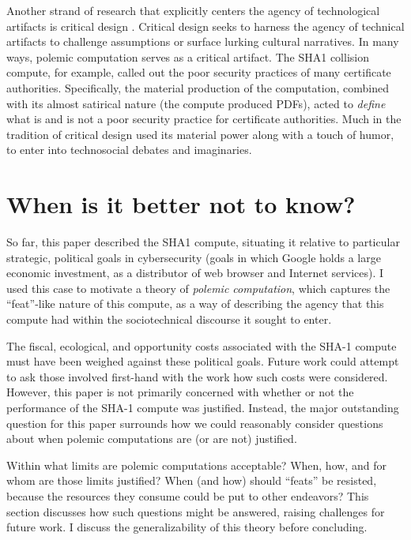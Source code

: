 \documentclass[sigconf]{acmart}
\begin{document}
Another strand of research that explicitly centers the agency of technological artifacts
is critical design \cite{Dunne2001}.
Critical design seeks to harness the agency of technical artifacts 
to challenge assumptions or surface lurking cultural narratives.
In many ways, polemic computation serves as a critical artifact.
The SHA1 collision compute, for example, 
called out the poor security practices of many certificate authorities.
Specifically, the material production of the computation,
combined with its almost satirical nature (the compute produced PDFs),
acted to \emph{define} what is and is not a poor security practice for certificate authorities.
Much in the tradition of critical design
used its material power \cite{Bennett2013a} along with a touch of humor, to enter into technosocial debates and imaginaries.

\section{When is it better not to know?}
\label{sec:orgffe5e6d}

So far, this paper described the SHA1 compute, situating it relative to particular strategic, political goals in cybersecurity (goals in which Google holds a large economic investment, as a distributor of web browser and Internet services).
I used this case to motivate a theory of \emph{polemic computation}, which captures the ``feat''-like nature of this compute, as a way of describing the agency that this compute had within the sociotechnical discourse it sought to enter.

The fiscal, ecological, and opportunity costs associated with the SHA-1 compute must have been weighed against these political goals. Future work could attempt to ask those involved first-hand with the work how such costs were considered.
However, this paper is not primarily concerned with whether or not the performance of the SHA-1 compute was justified. 
Instead, the major outstanding question for this paper surrounds how we could reasonably consider questions about when polemic computations are (or are not) justified.

Within what limits are polemic computations acceptable?
When, how, and for whom are those limits justified? 
When (and how) should ``feats'' be resisted, because the resources they consume could be put to other endeavors? 
This section discusses how such questions might be answered, raising challenges for future work. 
I discuss the generalizability of this theory before concluding.
\end{document}
